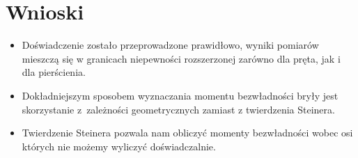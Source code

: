 \documentclass[a4paper,11pt]{article}
\begin{document}
\section{Wnioski}
\begin{itemize}
\item Doświadczenie zostało przeprowadzone prawidłowo, wyniki pomiarów mieszczą się w granicach niepewności rozszerzonej zarówno dla pręta, jak i dla pierścienia.
\item Dokładniejszym sposobem wyznaczania momentu bezwładności bryły jest skorzystanie z~zależności geometrycznych zamiast z twierdzenia Steinera.
\item Twierdzenie Steinera pozwala nam obliczyć momenty bezwładności wobec osi których nie możemy wyliczyć doświadczalnie.

\end{itemize}
\end{document}
